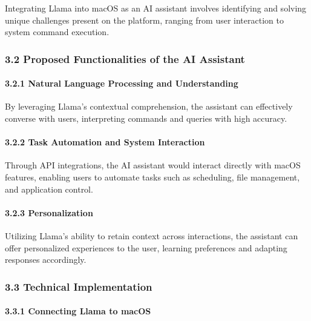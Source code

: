 Integrating Llama into macOS as an AI assistant involves identifying and
solving unique challenges present on the platform, ranging from user
interaction to system command execution.

\hypertarget{proposed-functionalities-of-the-ai-assistant}{%
\subsubsection{3.2 Proposed Functionalities of the AI
Assistant}\label{proposed-functionalities-of-the-ai-assistant}}

\hypertarget{natural-language-processing-and-understanding}{%
\paragraph{3.2.1 Natural Language Processing and
Understanding}\label{natural-language-processing-and-understanding}}

By leveraging Llama's contextual comprehension, the assistant can
effectively converse with users, interpreting commands and queries with
high accuracy.

\hypertarget{task-automation-and-system-interaction}{%
\paragraph{3.2.2 Task Automation and System
Interaction}\label{task-automation-and-system-interaction}}

Through API integrations, the AI assistant would interact directly with
macOS features, enabling users to automate tasks such as scheduling,
file management, and application control.

\hypertarget{personalization}{%
\paragraph{3.2.3 Personalization}\label{personalization}}

Utilizing Llama's ability to retain context across interactions, the
assistant can offer personalized experiences to the user, learning
preferences and adapting responses accordingly.

\hypertarget{technical-implementation}{%
\subsubsection{3.3 Technical
Implementation}\label{technical-implementation}}

\hypertarget{connecting-llama-to-macos}{%
\paragraph{3.3.1 Connecting Llama to
macOS}\label{connecting-llama-to-macos}}

